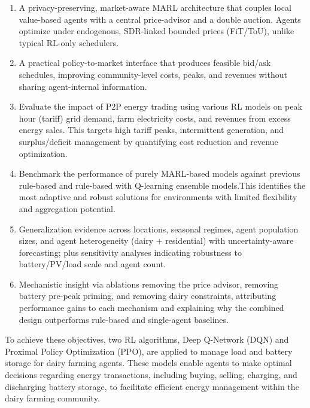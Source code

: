 \documentclass[preprint,12pt]{elsarticle}
\begin{document}
\begin{enumerate}

    \item A privacy-preserving, market-aware MARL architecture that couples local value-based agents with a central price-advisor and a double auction. Agents optimize under endogenous, SDR-linked bounded prices (FiT/ToU), unlike typical RL-only schedulers.
    
    \item A practical policy-to-market interface that produces feasible bid/ask schedules, improving community-level costs, peaks, and revenues without sharing agent-internal information.

    \item Evaluate the impact of P2P energy trading using various RL models on peak hour (tariff) grid demand, farm electricity costs, and revenues from excess energy sales. This targets high tariff peaks, intermittent generation, and surplus/deficit management by quantifying cost reduction and revenue optimization.
    
    \item Benchmark the performance of purely MARL-based models against previous rule-based and rule-based with Q-learning ensemble models.This identifies the most adaptive and robust solutions for environments with limited flexibility and aggregation potential.
    
    \item Generalization evidence across locations, seasonal regimes, agent population sizes, and agent heterogeneity (dairy + residential) with uncertainty-aware forecasting; plus sensitivity analyses indicating robustness to battery/PV/load scale and agent count.
    
    \item Mechanistic insight via ablations removing the price advisor, removing battery pre-peak priming, and removing dairy constraints, attributing performance gains to each mechanism and explaining why the combined design outperforms rule-based and single-agent baselines.
 
\end{enumerate}


To achieve these objectives, two RL algorithms, Deep Q-Network (DQN) and Proximal Policy Optimization (PPO), are applied to manage load and battery storage for dairy farming agents. These models enable agents to make optimal decisions regarding energy transactions, including buying, selling, charging, and discharging battery storage, to facilitate efficient energy management within the dairy farming community.
\end{document}
